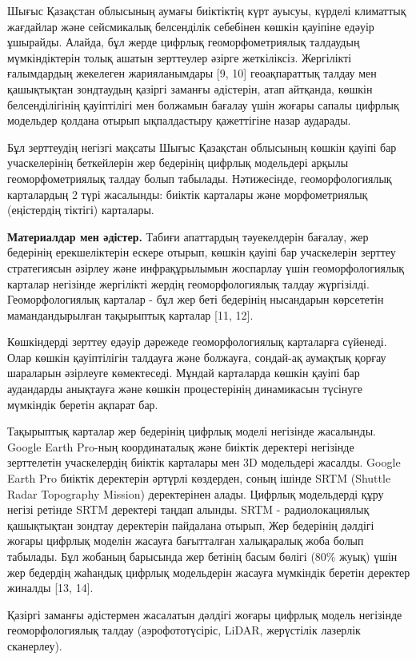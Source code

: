 Шығыс Қазақстан облысының аумағы биіктіктің күрт ауысуы, күрделі
климаттық жағдайлар және сейсмикалық белсенділік себебінен көшкін
қауіпіне едәуір ұшырайды. Алайда, бұл жерде цифрлық геоморфометриялық
талдаудың мүмкіндіктерін толық ашатын зерттеулер әзірге жеткіліксіз.
Жергілікті ғалымдардың жекелеген жарияланымдары {[}9, 10{]}
геоақпараттық талдау мен қашықтықтан зондтаудың қазіргі заманғы
әдістерін, атап айтқанда, көшкін белсенділігінің қауіптілігі мен
болжамын бағалау үшін жоғары сапалы цифрлық модельдер қолдана отырып
ықпалдастыру қажеттігіне назар аударады.

Бұл зерттеудің негізгі мақсаты Шығыс Қазақстан облысының көшкін қауіпі
бар учаскелерінің беткейлерін жер бедерінің цифрлық модельдері арқылы
геоморфометриялық талдау болып табылады. Нәтижесінде, геоморфологиялық
карталардың 2 түрі жасалынды: биіктік карталары және морфометриялық
(еңістердің тіктігі) карталары.

{\bfseries Материалдар мен әдістер.} Табиғи апаттардың тәуекелдерін
бағалау, жер бедерінің ерекшеліктерін ескере отырып, көшкін қауіпі бар
учаскелерін зерттеу стратегиясын әзірлеу және инфрақұрылымын жоспарлау
үшін геоморфологиялық карталар негізінде жергілікті жердің
геоморфологиялық талдау жүргізілді. Геоморфологиялық карталар - бұл жер
беті бедерінің нысандарын көрсететін мамандандырылған тақырыптық
карталар {[}11, 12{]}.

Көшкіндерді зерттеу едәуір дәрежеде геоморфологиялық карталарға
сүйенеді. Олар көшкін қауіптілігін талдауға және болжауға, сондай-ақ
аумақтық қорғау шараларын әзірлеуге көмектеседі. Мұндай карталарда
көшкін қауіпі бар аудандарды анықтауға және көшкін процестерінің
динамикасын түсінуге мүмкіндік беретін ақпарат бар.

Тақырыптық карталар жер бедерінің цифрлық моделі негізінде жасалынды.
Google Earth Pro-ның координаталық және биіктік деректері негізінде
зерттелетін учаскелердің биіктік карталары мен 3D модельдері жасалды.
Google Earth Pro биіктік деректерін әртүрлі көздерден, соның ішінде SRTM
(Shuttle Radar Topography Mission) деректерінен алады. Цифрлық
модельдерді құру негізі ретінде SRTM деректері таңдап алынды. SRTM -
радиолокациялық қашықтықтан зондтау деректерін пайдалана отырып, Жер
бедерінің дәлдігі жоғары цифрлық моделін жасауға бағытталған халықаралық
жоба болып табылады. Бұл жобаның барысында жер бетінің басым бөлігі
(80\% жуық) үшін жер бедердің жаһандық цифрлық модельдерін жасауға
мүмкіндік беретін деректер жиналды {[}13, 14{]}.

Қазіргі заманғы әдістермен жасалатын дәлдігі жоғары цифрлық модель
негізінде геоморфологиялық талдау (аэрофототүсіріс, LiDAR, жерүстілік
лазерлік сканерлеу).

